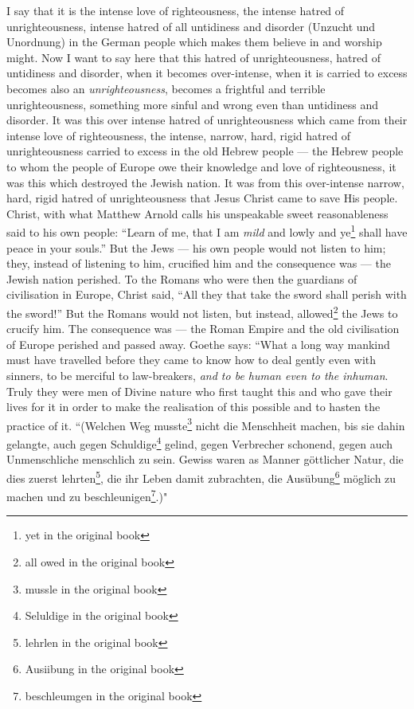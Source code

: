 I say that it is the intense love of righteousness, the intense hatred of unrighteousness, intense hatred of all untidiness and disorder (Unzucht und Unordnung) in the German people which makes them believe in and worship might.
Now I want to say here that this hatred of unrighteousness, hatred of untidiness and disorder, when it becomes over-intense, when it is carried to excess becomes also an \emph{unrighteousness}, becomes a frightful and terrible unrighteousness, something more sinful and wrong even than untidiness and disorder.
It was this over intense hatred of unrighteousness which came from their intense love of righteousness, the intense, narrow, hard, rigid hatred of unrighteousness carried to excess in the old Hebrew people --- the Hebrew people to whom the people of Europe owe their knowledge and love of righteousness, it was this which destroyed the Jewish nation.
It was from this over-intense narrow, hard, rigid hatred of unrighteousness that Jesus Christ came to save His people.
Christ, with what Matthew Arnold calls his unspeakable sweet reasonableness said to his own people: ``Learn of me, that I am \emph{mild} and lowly and ye\footnote{yet in the original book} shall have peace in your souls.''
But the Jews --- his own people would not listen to him; they, instead of listening to him, crucified him and the consequence was --- the Jewish nation perished.
To the Romans who were then the guardians of civilisation in Europe, Christ said, ``All they that take the sword shall perish with the sword!''\cite{num8} 
But the Romans would not listen, but instead, allowed\footnote{all owed in the original book} the Jews to crucify him.
The consequence was --- the Roman Empire and the old civilisation of Europe perished and passed away.
Goethe says: ``What a long way mankind must have travelled before they came to know how to deal gently even with sinners, to be merciful to law-breakers, \emph{and to be human even to the inhuman}.
Truly they were men of Divine nature who first taught this and who gave their lives for it in order to make the realisation of this possible and to hasten the practice of it.
``(Welchen Weg musste\footnote{mussle in the original book} nicht die Menschheit machen, bis sie dahin gelangte, auch gegen Schuldige\footnote{Seluldige in the original book} gelind, gegen Verbrecher schonend, gegen auch Unmenschliche menschlich zu sein. Gewiss waren as Manner g\"ottlicher Natur, die dies zuerst lehrten\footnote{lehrlen in the original book}, die ihr Leben damit zubrachten, die Aus\"ubung\footnote{Ausiibung in the original book} m\"oglich zu machen und zu beschleunigen\footnote{beschleumgen in the original book}.)"

